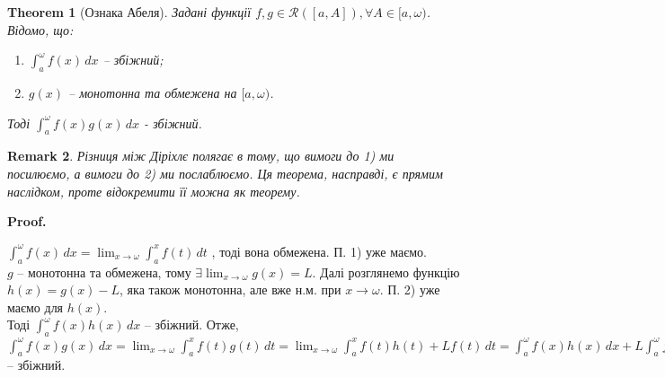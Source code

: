 \documentclass[a4paper, 10pt]{article}
\makeatletter
\def\huge{\displaystyle}
\def\qed{$\blacksquare$}
\theoremstyle{theoremdd}
\newtheorem{theorem}{Theorem}[subsection]
\theoremstyle{theoremdd}
\theoremstyle{theoremdd}
\theoremstyle{theoremdd}
\theoremstyle{theoremdd}
\theoremstyle{theoremdd}
\theoremstyle{theoremdd}
\newtheorem{remark}[theorem]{Remark}
\theoremstyle{theoremdd}
\theoremstyle{theoremdd}
\renewenvironment{proof}[1][Proof.\\]{\par
\pushQED{\hfill \qed}%
\normalfont \topsep6\p@\@plus6\p@\relax
\trivlist
\item\relax
{\bfseries
#1\@addpunct{.}}\hspace\labelsep\ignorespaces
}{%
\popQED\endtrivlist\@endpefalse
}
\makeatother
\begin{document}
\begin{theorem}[Ознака Абеля]
Задані функції $f,g \in \mathcal{R}([a,A]), \forall A \in [a,\omega)$. Відомо, що:
\begin{enumerate}[nosep,wide=0pt,label={\arabic*)}]
\item $\huge\int_a^\omega f(x)\,dx$ -- збіжний;
\item $g(x)$ -- монотонна та обмежена на $[a,\omega)$.
\end{enumerate}
Тоді $\huge\int_a^\omega f(x)g(x)\,dx$ - збіжний.
\end{theorem}

\begin{remark}
Різниця між Діріхлє полягає в тому, що вимоги до 1) ми посилюємо, а вимоги до 2) ми послаблюємо. Ця теорема, насправді, є прямим наслідком, проте відокремити її можна як теорему.
\end{remark}

\begin{proof}
$\huge\int_a^\omega f(x)\,dx = \huge\lim_{x \to \omega} \int_a^x f(t)\,dt$ , тоді вона обмежена. П. 1) уже маємо.\\
$g$ -- монотонна та обмежена, тому $\exists \huge\lim_{x \to \omega} g(x) = L$. Далі розглянемо функцію $h(x) = g(x) - L$, яка також монотонна, але вже н.м. при $x \to \omega$. П. 2) уже маємо для $h(x)$.\\
Тоді $\huge\int_a^\omega f(x)h(x)\,dx$ -- збіжний. Отже,\\
$\huge\int_a^\omega f(x)g(x)\,dx = \huge\lim_{x \to \omega} \int_a^x f(t)g(t)\,dt = \huge\lim_{x \to \omega} \int_a^x f(t)h(t)+Lf(t)\,dt = \int_a^\omega f(x)h(x)\,dx + L \int_a^\omega f(x)\,dx$ -- збіжний.
\end{proof}
\end{document}

